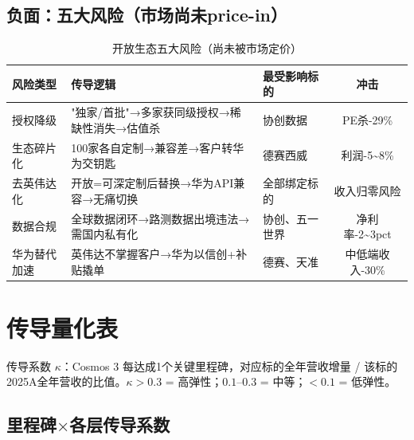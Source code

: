 \subsection{负面：五大风险（市场尚未price-in）}

\begin{table}[H]
\centering\scriptsize
\renewcommand{\arraystretch}{1.15}
\begin{tabularx}{\textwidth}{l X l c}
\toprule
\textbf{风险类型} & \textbf{传导逻辑} & \textbf{最受影响标的} & \textbf{冲击} \\
\midrule
授权降级 & "独家/首批"→多家获同级授权→稀缺性消失→估值杀 & 协创数据 & PE杀-29\% \\
生态碎片化 & 100家各自定制→兼容差→客户转华为交钥匙 & 德赛西威 & 利润-5\textasciitilde8\% \\
去英伟达化 & 开放=可深定制后替换→华为API兼容→无痛切换 & 全部绑定标的 & 收入归零风险 \\
数据合规 & 全球数据闭环→路测数据出境违法→需国内私有化 & 协创、五一世界 & 净利率-2\textasciitilde3pct \\
华为替代加速 & 英伟达不掌握客户→华为以信创+补贴撬单 & 德赛、天准 & 中低端收入-30\% \\
\bottomrule
\end{tabularx}
\caption{开放生态五大风险（尚未被市场定价）}
\end{table}

\section{传导量化表}

传导系数 $\kappa$：Cosmos 3 每达成1个关键里程碑，对应标的全年营收增量 / 该标的2025A全年营收的比值。$\kappa > 0.3$ = 高弹性；$0.1$--$0.3$ = 中等；$< 0.1$ = 低弹性。

\subsection{里程碑$\times$各层传导系数}

